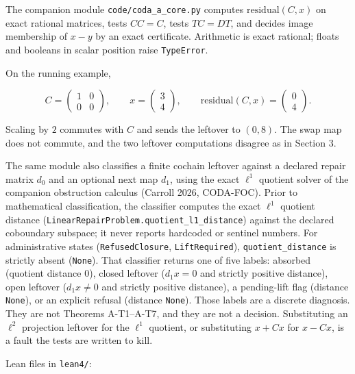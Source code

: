 \documentclass[
  11pt,
]{article}
\begin{document}
The companion module \nolinkurl{code/coda_a_core.py} computes \(\mathrm{residual}(C,x)\) on exact rational matrices, tests \(CC=C\), tests \(TC=DT\), and decides image membership of \(x-y\) by an exact certificate. Arithmetic is exact rational; floats and booleans in scalar position raise \texttt{TypeError}.

On the running example,

\[
C=\begin{pmatrix}1&0\\0&0\end{pmatrix},\qquad
x=\begin{pmatrix}3\\4\end{pmatrix},\qquad
\mathrm{residual}(C,x)=\begin{pmatrix}0\\4\end{pmatrix}.
\]

Scaling by \(2\) commutes with \(C\) and sends the leftover to \((0,8)\). The swap map does not commute, and the two leftover computations disagree as in Section 3.

The same module also classifies a finite cochain leftover against a declared repair matrix \(d_0\) and an optional next map \(d_1\), using the exact \(\ell^1\) quotient solver of the companion obstruction calculus (Carroll 2026, CODA-FOC). Prior to mathematical classification, the classifier computes the exact \(\ell^1\) quotient distance (\nolinkurl{LinearRepairProblem.quotient_l1_distance}) against the declared coboundary subspace; it never reports hardcoded or sentinel numbers. For administrative states (\texttt{RefusedClosure}, \texttt{LiftRequired}), \texttt{quotient\_distance} is strictly absent (\texttt{None}). That classifier returns one of five labels: absorbed (quotient distance \(0\)), closed leftover (\(d_1x=0\) and strictly positive distance), open leftover (\(d_1x\neq 0\) and strictly positive distance), a pending-lift flag (distance \texttt{None}), or an explicit refusal (distance \texttt{None}). Those labels are a discrete diagnosis. They are not Theorems A-T1--A-T7, and they are not a decision. Substituting an \(\ell^2\) projection leftover for the \(\ell^1\) quotient, or substituting \(x+Cx\) for \(x-Cx\), is a fault the tests are written to kill.

Lean files in \texttt{lean4/}:
\end{document}
